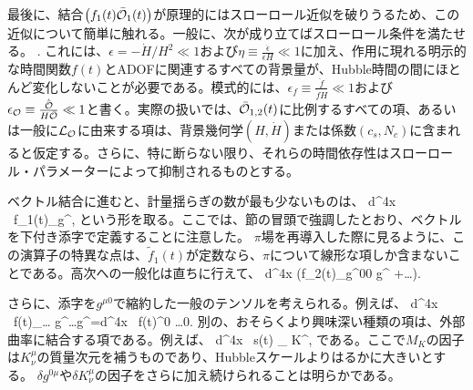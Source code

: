 最後に、結合$\left(f_1(t)\bar{{\cal O}}_1(t)\right)$が原理的にはスローロール近似を破りうるため、この近似について簡単に触れる。一般に、次が成り立てばスローロール条件を満たせる。
\beq \label{condV}  \lesssim{}.\eeq
これには、$\epsilon=-\dot H/H^2\ll 1$および$\eta \equiv \frac{\dot \epsilon}{\epsilon H}\ll 1$に加え、作用に現れる明示的な時間関数$f(t)$とADOFに関連するすべての背景量が、Hubble時間の間にほとんど変化しないことが必要である。模式的には、$\epsilon_f \equiv \frac{\ddot f}{\dot f H}\ll 1$および$\epsilon_{{\cal O}} \equiv \frac{\dot{\bar{{\cal O}}}}{H\bar{{\cal O}}}\ll 1$と書く。実際の扱いでは、$\bar{{\cal O}}_{1,2}(t)$に比例するすべての項、あるいは一般に${\cal L}_{\cal O}$に由来する項は、背景幾何学$(H,\dot H)$または係数$(c_s, N_c)$に含まれると仮定する。さらに、特に断らない限り、それらの時間依存性はスローロール・パラメーターによって抑制されるものとする。

\label{vectors}

ベクトル結合に進むと、計量揺らぎの数が最も少ないものは、
\beq
\label{linpim0}
\int d^4x ~\tilde f_1(t)\calo_\mu \delta g^{},
\eeq
という形を取る。ここでは、節の冒頭で強調したとおり、ベクトルを下付き添字で定義することに注意した。
$\pi$場を再導入した際に見るように、この演算子の特異な点は、$\tilde f_1(t)$が定数なら、$\pi$について線形な項しか含まないことである。高次への一般化は直ちに行えて、
\beq
\int d^4x  \left(\tilde f_2(t)\calo_\alpha \delta g^{00} \delta g^{} +\ldots \right).
\eeq


\label{tensors}


さらに、添字を$g^{\mu0}$で縮約した一般のテンソルを考えられる。例えば、
\beq
\int d^4x  ~\hat f(t)\calo_{\mu\ldots\nu} \delta g^{}\ldots \delta g^{}=\int d^4x ~\hat f(t)\calo^{0 \ldots 0}.
\eeq
別の、おそらくより興味深い種類の項は、外部曲率に結合する項である。例えば、
\beq
\label{extcalo}
\int d^4x  ~s(t) \tilde\calo_{\mu\nu} \delta K^{\nu\mu},
\eeq
である。ここで$M_K$の因子は$K^\mu_\nu$の質量次元を補うものであり、Hubbleスケールよりはるかに大きいとする。
$\delta g^{0\mu}$や$\delta K^\mu_\nu$の因子をさらに加え続けられることは明らかである。

